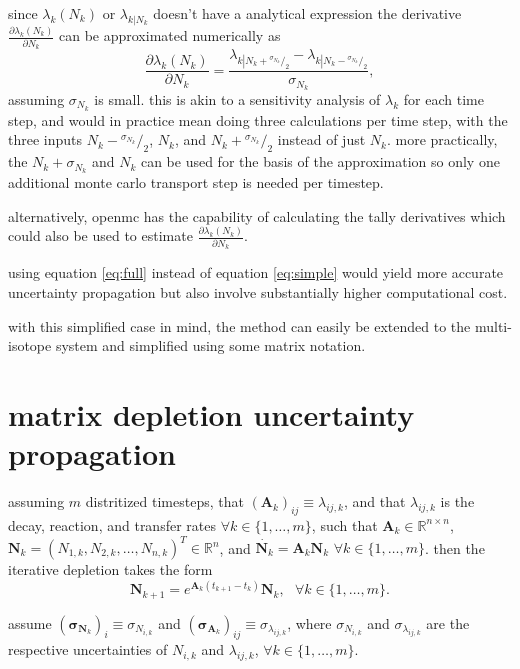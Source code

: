\documentclass[a4paper]{article}
\newcommand*\rfrac[2]{{}^{#1}\!/_{#2}}
\begin{document}
since $\lambda_k(N_k)$ or $\lambda_{k\left\vert N_k \right.}$ doesn't have a analytical expression the derivative $\frac{\partial \lambda_k(N_k)}{\partial N_k}$ can be approximated numerically as
\begin{equation}
  \frac{\partial \lambda_k(N_k)}{\partial N_k} = \frac{\lambda_{k\left\vert N_k+\rfrac{\sigma_{N_k}}{2}\right.} - \lambda_{k\left\vert N_k-\rfrac{\sigma_{N_k}}{2}\right.} }{\sigma_{N_k}},
\end{equation}
assuming $\sigma_{N_k}$ is small.
this is akin to a sensitivity analysis of $\lambda_k$ for each time step, and would in practice mean doing three calculations per time step, with the three inputs $N_k-\rfrac{\sigma_{N_k}}{2}$, $N_k$, and $N_k+\rfrac{\sigma_{N_k}}{2}$ instead of just $N_k$. more practically, the $N_k+\sigma_{N_k}$ and $N_k$ can be used for the basis of the approximation so only one additional monte carlo transport step is needed per timestep.

alternatively, openmc has the capability of calculating the tally derivatives which could also be used to estimate $\frac{\partial \lambda_k(N_k)}{\partial N_k}$.

using equation \ref{eq:full} instead of equation \ref{eq:simple} would yield more accurate uncertainty propagation but also involve substantially higher computational cost.

with this simplified case in mind, the method can easily be extended to the multi-isotope system and simplified using some matrix notation.


\section*{matrix depletion uncertainty propagation}
assuming $m$ distritized timesteps, that $(\bm{A}_k)_{ij}\equiv\lambda_{ij,k}$, and that $\lambda_{ij,k}$ is the decay, reaction, and transfer rates $\forall k\in\{1,\ldots,m\}$, such that $\bm{A}_k\in\mathbb{R}^{n\times n}$, $\bm{N}_k=(N_{1,k},N_{2,k},\ldots,N_{n,k})^T\in\mathbb{R}^n$, and $\dot{\bm{N}_k}=\bm{A}_k\bm{N}_k$ $\forall k\in\{1,\ldots,m\}$.
then the iterative depletion takes the form
\begin{equation}
  \bm{N}_{k+1}=e^{\bm{A}_k(t_{k+1}-t_k)}\bm{N}_k, ~~~\forall k\in\{1,\ldots,m\}.
\end{equation}

assume $(\bm{\sigma}_{\bm{N}_k})_{i}\equiv\sigma_{N_{i,k}}$ and $(\bm{\sigma}_{\bm{A}_k})_{ij}\equiv\sigma_{\lambda_{ij,k}}$, where $\sigma_{N_{i,k}}$ and $\sigma_{\lambda_{ij,k}}$ are the respective uncertainties of $N_{i,k}$ and $\lambda_{ij,k}$, $\forall k\in\{1,\ldots,m\}$.
\end{document}
